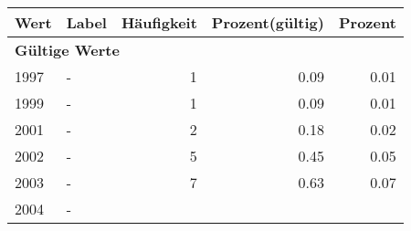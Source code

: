      \begin{longtable}{lXrrr}
     \toprule
     \textbf{Wert} & \textbf{Label} & \textbf{Häufigkeit} & \textbf{Prozent(gültig)} & \textbf{Prozent} \\
     \endhead
     \midrule
     \multicolumn{5}{l}{\textbf{Gültige Werte}}\\

     1997 &
     \multicolumn{1}{X}{ -  } &


       \num{1} &
       \num[round-mode=places,round-precision=2]{0.09} &
         \num[round-mode=places,round-precision=2]{0.01} \\

     1999 &
     \multicolumn{1}{X}{ -  } &


       \num{1} &
       \num[round-mode=places,round-precision=2]{0.09} &
         \num[round-mode=places,round-precision=2]{0.01} \\

     2001 &
     \multicolumn{1}{X}{ -  } &


       \num{2} &
       \num[round-mode=places,round-precision=2]{0.18} &
         \num[round-mode=places,round-precision=2]{0.02} \\

     2002 &
     \multicolumn{1}{X}{ -  } &


       \num{5} &
       \num[round-mode=places,round-precision=2]{0.45} &
         \num[round-mode=places,round-precision=2]{0.05} \\

     2003 &
     \multicolumn{1}{X}{ -  } &


       \num{7} &
       \num[round-mode=places,round-precision=2]{0.63} &
         \num[round-mode=places,round-precision=2]{0.07} \\

     2004 &
     \multicolumn{1}{X}{ -  } &



\end{longtable}
